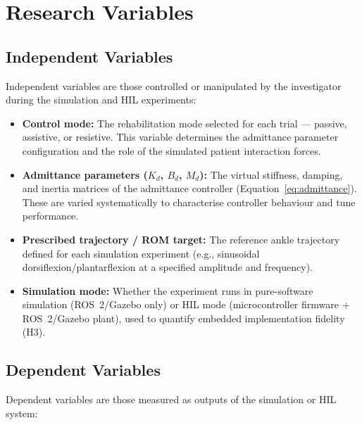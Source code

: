 \section{Research Variables}

\subsection{Independent Variables}

Independent variables are those controlled or manipulated by the investigator during the simulation and HIL experiments:

\begin{itemize}
    \item \textbf{Control mode:} The rehabilitation mode selected for each trial — passive, assistive, or resistive. This variable determines the admittance parameter configuration and the role of the simulated patient interaction forces.
    \item \textbf{Admittance parameters ($K_d$, $B_d$, $M_d$):} The virtual stiffness, damping, and inertia matrices of the admittance controller (Equation~\ref{eq:admittance}). These are varied systematically to characterise controller behaviour and tune performance.
    \item \textbf{Prescribed trajectory / ROM target:} The reference ankle trajectory defined for each simulation experiment (e.g., sinusoidal dorsiflexion/plantarflexion at a specified amplitude and frequency).
    \item \textbf{Simulation mode:} Whether the experiment runs in pure-software simulation (ROS~2/Gazebo only) or HIL mode (microcontroller firmware + ROS~2/Gazebo plant), used to quantify embedded implementation fidelity (H3).
\end{itemize}

\subsection{Dependent Variables}

Dependent variables are those measured as outputs of the simulation or HIL system:

